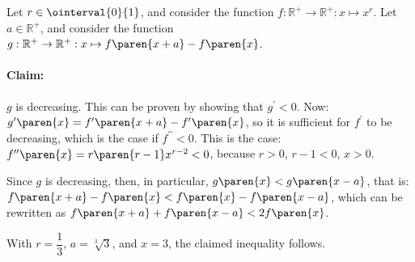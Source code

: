 Let $r \in \ointerval{0}{1}$,
and consider the function $f : \mathbb{R}^{+} \to \mathbb{R}^{+} : x \mapsto x^r$.
Let $a \in \mathbb{R}^{+}$,
and consider the function $g : \mathbb{R}^{+} \to \mathbb{R}^{+} : x \mapsto f\paren{x + a} - f\paren{x}$.

\paragraph{Claim:} $g$ is decreasing. \newline
This can be proven by showing that $g^{\prime} < 0$.
Now: $g^{\prime}\paren{x} = f^{\prime}\paren{x + a} - f^{\prime}\paren{x}$,
so it is sufficient for $f^{\prime}$ to be decreasing,
which is the case if $f^{\prime\prime} < 0$.
This is the case: $f^{\prime\prime}\paren{x} = r \paren{r - 1} x^{r - 2} < 0$,
because $r > 0$, $r - 1 < 0$, $x > 0$.

Since $g$ is decreasing, then, in particular, $g\paren{x} < g\paren{x - a}$,
that is: $f\paren{x + a} - f\paren{x} < f\paren{x} - f\paren{x - a}$,
which can be rewritten as $f\paren{x + a} + f\paren{x - a} < 2 f\paren{x} $.

With $r = \dfrac{1}{3}$, $a = \sqrt[3]{3}$, and $x = 3$,
the claimed inequality follows.
